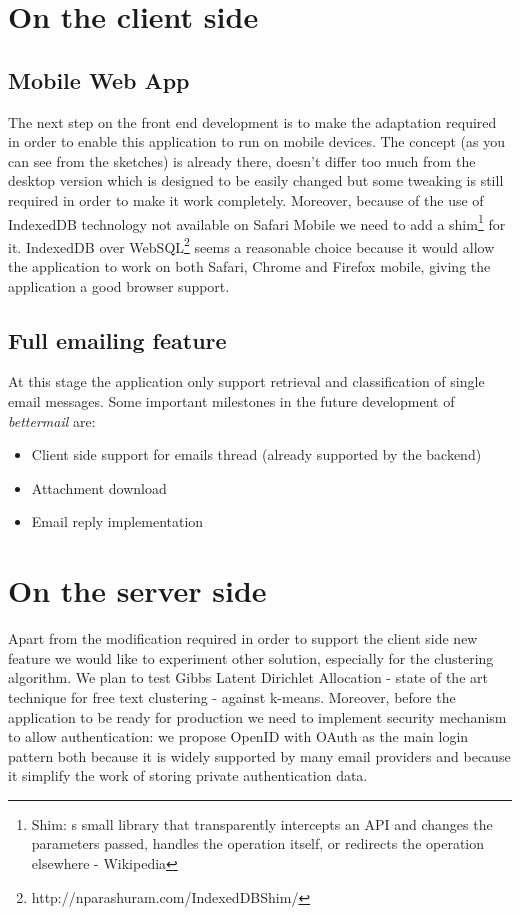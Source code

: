 \documentclass[a4paper,12pt]{report}
\begin{document}
\section{On the client side}
\subsection{Mobile Web App} %
\label{sub:mobile_web_app}


The next step on the front end development is to make the adaptation required in order to enable this application to run on mobile devices. The concept (as you can see from the sketches) is already there, doesn't differ too much from the desktop version which is designed to be easily changed but some tweaking is still required in order to make it work completely.
Moreover, because of the use of IndexedDB technology not available on Safari Mobile we need to add a shim\footnote{Shim: s small library that transparently intercepts an API and changes the parameters passed, handles the operation itself, or redirects the operation elsewhere - Wikipedia} for it. IndexedDB over WebSQL\footnote{http://nparashuram.com/IndexedDBShim/} seems a reasonable choice because it would allow the application to work on both Safari, Chrome and Firefox mobile, giving the application a good browser support.
\subsection{Full emailing feature} %
\label{sub:full_emailing_feature}
At this stage the application only support retrieval and classification of single email messages. Some important milestones in the future development of \emph{bettermail} are:
\begin{itemize}
  \item Client side support for emails thread (already supported by the backend)
  \item Attachment download
  \item Email reply implementation 
\end{itemize}

\section{On the server side}

Apart from the modification required in order to support the client side new feature we would like to experiment other solution, especially for the clustering algorithm. We plan to test Gibbs Latent Dirichlet Allocation - state of the art technique for free text clustering - against k-means. 
Moreover, before the application to be ready for production we need to implement security mechanism to allow authentication: we propose OpenID with OAuth as the main login pattern both because it is widely supported by many email providers and because it simplify the work of storing private authentication data.
\end{document}
